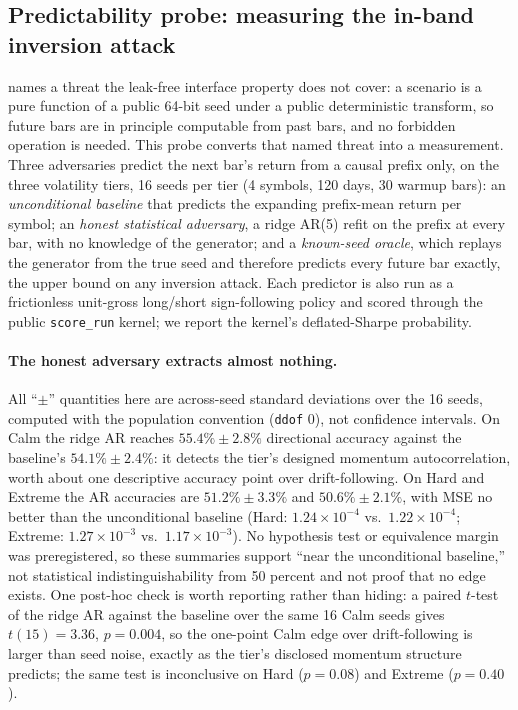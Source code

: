 
\subsection{Predictability probe: measuring the in-band inversion attack}\label{sec:predictability}

 names a threat the leak-free interface property does not cover: a scenario is a pure function of a public 64-bit seed under a public deterministic transform, so future bars are in principle computable from past bars, and no forbidden operation is needed. This probe converts that named threat into a measurement. Three adversaries predict the next bar's return from a causal prefix only, on the three volatility tiers, 16 seeds per tier (4 symbols, 120 days, 30 warmup bars): an \emph{unconditional baseline} that predicts the expanding prefix-mean return per symbol; an \emph{honest statistical adversary}, a ridge AR(5) refit on the prefix at every bar, with no knowledge of the generator; and a \emph{known-seed oracle}, which replays the generator from the true seed and therefore predicts every future bar exactly, the upper bound on any inversion attack. Each predictor is also run as a frictionless unit-gross long/short sign-following policy and scored through the public \texttt{score\_run} kernel; we report the kernel's deflated-Sharpe probability.

\paragraph{The honest adversary extracts almost nothing.} All ``$\pm$'' quantities here are across-seed standard deviations over the 16 seeds, computed with the population convention (\texttt{ddof} 0), not confidence intervals. On Calm the ridge AR reaches $55.4\% \pm 2.8\%$ directional accuracy against the baseline's $54.1\% \pm 2.4\%$: it detects the tier's designed momentum autocorrelation, worth about one descriptive accuracy point over drift-following. On Hard and Extreme the AR accuracies are $51.2\% \pm 3.3\%$ and $50.6\% \pm 2.1\%$, with MSE no better than the unconditional baseline (Hard: $1.24\times10^{-4}$ vs.\ $1.22\times10^{-4}$; Extreme: $1.27\times10^{-3}$ vs.\ $1.17\times10^{-3}$). No hypothesis test or equivalence margin was preregistered, so these summaries support ``near the unconditional baseline,'' not statistical indistinguishability from 50 percent and not proof that no edge exists. One post-hoc check is worth reporting rather than hiding: a paired $t$-test of the ridge AR against the baseline over the same 16 Calm seeds gives $t(15) = 3.36$, $p = 0.004$, so the one-point Calm edge over drift-following is larger than seed noise, exactly as the tier's disclosed momentum structure predicts; the same test is inconclusive on Hard ($p = 0.08$) and Extreme ($p = 0.40$).

